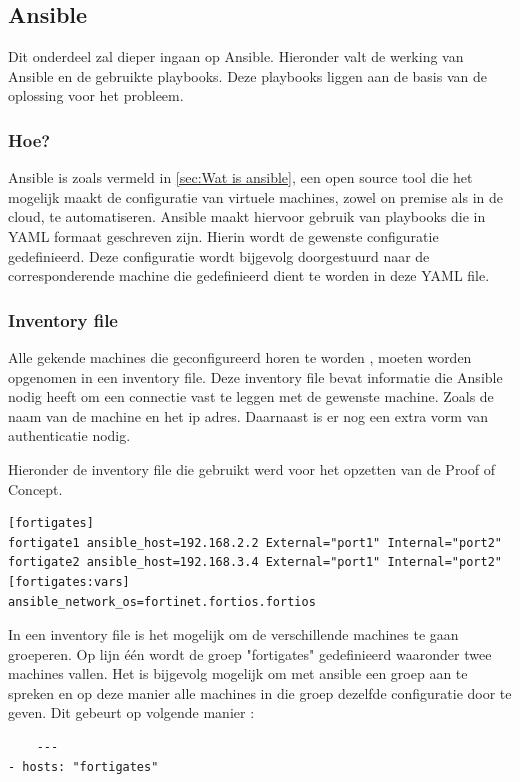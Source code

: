 \subsection{Ansible}
\label{sec:Ansible}
Dit onderdeel zal dieper ingaan op Ansible. Hieronder valt de werking van Ansible en de gebruikte playbooks. Deze playbooks liggen aan de basis van de oplossing voor het probleem. 

\subsubsection{Hoe?}
Ansible is zoals vermeld in \ref{sec:Wat is ansible}, een open source tool die het mogelijk maakt de configuratie van virtuele machines, zowel on premise als in de cloud, te automatiseren. Ansible maakt hiervoor gebruik van playbooks die in YAML formaat geschreven zijn. Hierin wordt de gewenste configuratie gedefinieerd. Deze configuratie wordt bijgevolg doorgestuurd naar de corresponderende machine die gedefinieerd dient te worden in deze YAML file.
\newline
\newline
\subsubsection{Inventory file}
Alle gekende machines die geconfigureerd horen te worden , moeten worden opgenomen in een inventory file. Deze inventory file bevat informatie die Ansible nodig heeft om een connectie vast te leggen met de gewenste machine. Zoals de naam van de machine en het ip adres. Daarnaast is er nog een extra vorm van authenticatie nodig. 

Hieronder de inventory file die gebruikt werd voor het opzetten van de Proof of Concept. 
\begin{lstlisting}
[fortigates]
fortigate1 ansible_host=192.168.2.2 External="port1" Internal="port2"
fortigate2 ansible_host=192.168.3.4 External="port1" Internal="port2"
[fortigates:vars]
ansible_network_os=fortinet.fortios.fortios
\end{lstlisting}


In een inventory file is het mogelijk om de verschillende machines te gaan groeperen. Op lijn één wordt de groep "fortigates" gedefinieerd waaronder twee machines vallen. Het is bijgevolg mogelijk om met ansible een groep aan te spreken en op deze manier alle machines in die groep dezelfde configuratie door te geven. Dit gebeurt op volgende manier :

\begin{lstlisting}
    ---
- hosts: "fortigates"
\end{lstlisting}

